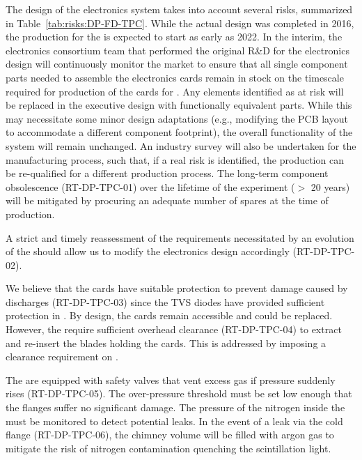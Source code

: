The design of the \dual electronics system takes into account several risks, summarized in Table~\ref{tab:risks:DP-FD-TPC}. While the actual design was completed in 2016, the production for the  is expected to start as early as 2022. In the interim, the   electronics consortium team that performed the original R\&D for the electronics design will continuously monitor the market to ensure that all single component parts needed to assemble the electronics cards remain in stock on the timescale required for production of the cards for . Any elements identified as at risk will be replaced in the executive design with functionally equivalent parts. While this may necessitate some minor design adaptations (e.g., modifying the PCB layout to accommodate a different component footprint), the overall functionality of the system will remain unchanged. An industry survey will also be undertaken for the   manufacturing process, such that, if a real risk is identified, the  production can be re-qualified for a different production process. The long-term component obsolescence (RT-DP-TPC-01) over the lifetime of the experiment ($>$ \num{20} years) will be mitigated by procuring an adequate number of spares at the time of production.

A strict and timely reassessment of the  requirements necessitated by an evolution of the \dual {} should allow us to modify the   electronics design accordingly (RT-DP-TPC-02).

We believe that the  cards have suitable protection to prevent damage caused by  discharges (RT-DP-TPC-03) since the  TVS diodes have provided sufficient protection in . By design, the  cards remain accessible and could be replaced. However, the  require sufficient overhead clearance (RT-DP-TPC-04) to extract and re-insert the blades holding the  cards. This is addressed by imposing a clearance requirement on .

The  are equipped with safety valves that vent excess gas if pressure suddenly rises (RT-DP-TPC-05). The over-pressure threshold must be set low enough that the flanges suffer no significant damage. The pressure of the nitrogen inside the  must be monitored to detect potential leaks. In the event of a leak via the cold flange (RT-DP-TPC-06), the chimney volume will be filled with argon gas to mitigate the risk of nitrogen contamination quenching the scintillation light.  

